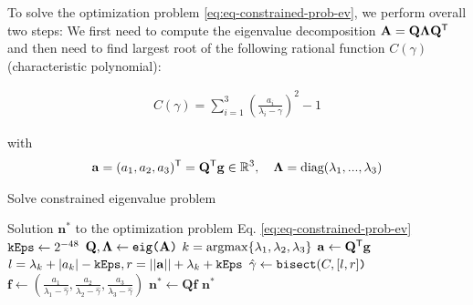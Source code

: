 To solve the optimization problem \ref{eq:eq-constrained-prob-ev}, we perform overall two steps: We first need to compute the eigenvalue decomposition  $\mathbf{A} = \mathbf{Q}\mathbf{\Lambda}\mathbf{Q}^{\mathsf{T}}$ and then need to find largest root of the following rational function $C(\gamma)$ (characteristic polynomial): 

\begin{equation}
	\label{eq:characterisitc-poly}
	\begin{aligned}
		C(\gamma) = \sum_{i=1}^3 \left(\frac{a_i}{\lambda_i - \gamma}\right)^2 - 1
	\end{aligned}
\end{equation}

with
\begin{equation}
	\begin{aligned}
		\mathbf{a} = (a_1, a_2, a_3)^{\mathsf{T}} = \mathbf{Q}^{\mathsf{T}} \mathbf{g} \in \mathbb{R}^3, \quad \mathbf{\Lambda} = \text{diag}(\lambda_1, ..., \lambda_3)
	\end{aligned}
\end{equation}

\begin{algorithm}[!ht]
	\caption{Solve constrained eigenvalue problem}
	\label{alg:solve-constrained-ev}
	\begin{algorithmic}[1]
		\Ensure Solution $\mathbf{n}^*$ to the optimization problem Eq. \ref{eq:eq-constrained-prob-ev}
		\hypertarget{ref:min-constrained-ev}{
			}
		\State $\texttt{kEps} \leftarrow 2^{-48}$ 
		\State $\mathbf{Q}, \mathbf{\Lambda} \leftarrow \texttt{eig(} \mathbf{A} \texttt{)}$ 
		\State $k = \operatorname*{argmax}\{\lambda_1, \lambda_2, \lambda_3\}$
		\State $\mathbf{a} \leftarrow \mathbf{Q}^{\mathsf{T}} \mathbf{g}$
		\State $l = \lambda_k + |a_k| - \texttt{kEps}, r = ||\mathbf{a}|| + \lambda_k + \texttt{kEps}$ 
		\State $\hat{\gamma} \leftarrow \texttt{bisect} (C, [l, r] \texttt{)}$ 
		\State $\mathbf{f} \leftarrow \left(\frac{a_1}{\lambda_1 - \hat{\gamma}}, \frac{a_2}{\lambda_2 - \hat{\gamma}}, \frac{a_3}{\lambda_3 - \hat{\gamma}} \right)$
		\State $\mathbf{n}^* \leftarrow \mathbf{Q}\mathbf{f}$ 
		\State \Return $\mathbf{n}^*$
		\EndFunction
	\end{algorithmic}
\end{algorithm}

